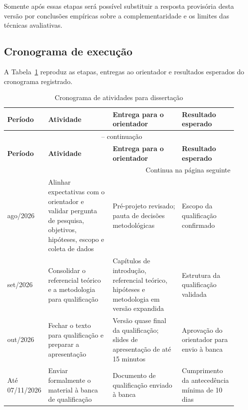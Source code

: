 Somente após essas etapas será possível substituir a resposta provisória desta versão por conclusões empíricas sobre a complementaridade e os limites das técnicas avaliativas.

\subsection{Cronograma de execução}

\label{sec:cronograma}

A Tabela~\ref{tab:cronograma} reproduz as etapas, entregas ao orientador e resultados esperados do cronograma registrado.

\begin{landscape}
\begingroup
\small
\setlength{\tabcolsep}{4pt}
\renewcommand{\arraystretch}{1.15}
\begin{longtable}{p{0.12\linewidth}p{0.28\linewidth}p{0.30\linewidth}p{0.24\linewidth}}
\caption{Cronograma de atividades para dissertação}\label{tab:cronograma}\\
\toprule
\textbf{Período} & \textbf{Atividade} & \textbf{Entrega para o orientador} & \textbf{Resultado esperado} \\
\midrule
\endfirsthead
\multicolumn{4}{c}{\tablename~\thetable{} -- continuação}\\
\toprule
\textbf{Período} & \textbf{Atividade} & \textbf{Entrega para o orientador} & \textbf{Resultado esperado} \\
\midrule
\endhead
\midrule
\multicolumn{4}{r}{Continua na página seguinte}\\
\endfoot
\bottomrule
\endlastfoot
ago/2026 & Alinhar expectativas com o orientador e validar pergunta de pesquisa, objetivos, hipóteses, escopo e coleta de dados & Pré-projeto revisado; pauta de decisões metodológicas & Escopo da qualificação confirmado \\
set/2026 & Consolidar o referencial teórico e a metodologia para qualificação & Capítulos de introdução, referencial teórico, hipóteses e metodologia em versão expandida & Estrutura da qualificação validada \\
out/2026 & Fechar o texto para qualificação e preparar a apresentação & Versão quase final da qualificação; slides de apresentação de até 15 minutos & Aprovação do orientador para envio à banca \\
Até 07/11/2026 & Enviar formalmente o material à banca de qualificação & Documento de qualificação enviado à banca & Cumprimento da antecedência mínima de 10 dias \\

\end{longtable}
\end{landscape}
